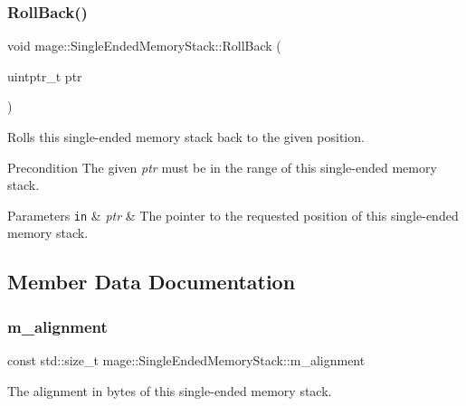 \subsubsection{\texorpdfstring{Roll\+Back()}{RollBack()}}
{\footnotesize\ttfamily void mage\+::\+Single\+Ended\+Memory\+Stack\+::\+Roll\+Back (\begin{DoxyParamCaption}\item[{uintptr\+\_\+t}]{ptr }\end{DoxyParamCaption})\hspace{0.3cm}{\ttfamily [noexcept]}}

Rolls this single-\/ended memory stack back to the given position.

\begin{DoxyPrecond}{Precondition}
The given {\itshape ptr} must be in the range of this single-\/ended memory stack. 
\end{DoxyPrecond}

\begin{DoxyParams}[1]{Parameters}
\mbox{\tt in}  & {\em ptr} & The pointer to the requested position of this single-\/ended memory stack. \\
\hline
\end{DoxyParams}


\subsection{Member Data Documentation}
\mbox{\label{classmage_1_1_single_ended_memory_stack_a0a1ba6274a7fa64fd554edd40a32aec9}} 
\subsubsection{\texorpdfstring{m\+\_\+alignment}{m\_alignment}}
{\footnotesize\ttfamily const std\+::size\+\_\+t mage\+::\+Single\+Ended\+Memory\+Stack\+::m\+\_\+alignment\hspace{0.3cm}{\ttfamily [private]}}

The alignment in bytes of this single-\/ended memory stack. \mbox{\label{classmage_1_1_single_ended_memory_stack_a2bac7d8cc59540fb3827bee13ffb6d3c}} 

